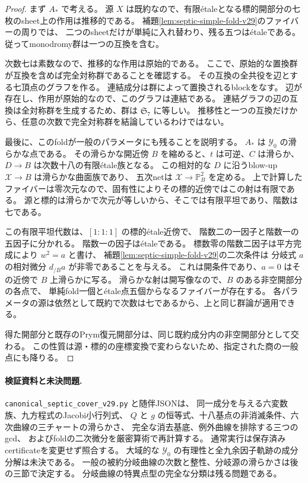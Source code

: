 \begin{proof}
まず $A_*$ で考える。
源 $X$ は既約なので、有限\'etaleとなる標的開部分の七枚のsheet上の作用は推移的である。
補題\ref{lem:septic-simple-fold-v29}のファイバーの周りでは、
二つのsheetだけが単純に入れ替わり、残る五つは\'etaleである。
従ってmonodromy群は一つの互換を含む。

次数七は素数なので、推移的な作用は原始的である。
ここで、原始的な置換群が互換を含めば完全対称群であることを確認する。
その互換の全共役を辺とする七頂点のグラフを作る。
連結成分は群によって置換されるblockをなす。
辺が存在し、作用が原始的なので、このグラフは連結である。
連結グラフの辺の互換は全対称群を生成するため、群は $\mathfrak S_7$ に等しい。
推移性と一つの互換だけから、任意の次数で完全対称群を結論しているわけではない。

最後に、このfoldが一般のパラメータにも残ることを説明する。
$A_*$ は $\mathcal Y_0$ の滑らかな点である。
その滑らかな開近傍 $B$ を縮めると、$t$ は可逆、$C$ は滑らか、
$D\to B$ は次数十八の有限\'etale族となる。
この相対的な $D$ に沿うblow-up $\mathcal X\to B$ は滑らかな曲面族であり、
五次netは $\mathcal X\to\mathbb P^2_B$ を定める。
上で計算したファイバーは零次元なので、固有性によりその標的近傍ではこの射は有限である。
源と標的は滑らかで次元が等しいから、そこでは有限平坦であり、階数は七である。

この有限平坦代数は、$[1:1:1]$ の標的\'etale近傍で、
階数二の一因子と階数一の五因子に分かれる。
階数一の因子は\'etaleである。
標数零の階数二因子は平方完成により $w^2=a$ と書け、
補題\ref{lem:septic-simple-fold-v29}の二次条件は
分岐式 $a$ の相対微分 $d_{/B}a$ が非零であることを与える。
これは開条件であり、$a=0$ はその近傍で $B$ 上滑らかに写る。
滑らかな射は開写像なので、$B$ のある非空開部分の各点で、
単純fold一個と\'etale点五個からなるファイバーが存在する。
各パラメータの源は依然として既約で次数は七であるから、上と同じ群論が適用できる。

得た開部分と既存のPrym復元開部分は、同じ既約成分内の非空開部分として交わる。
この性質は源・標的の座標変換で変わらないため、指定された商の一般点にも降りる。
\end{proof}

\paragraph{検証資料と未決問題.}
\nolinkurl{canonical_septic_cover_v29.py} と随伴JSONは、
同一成分を与える六変数族、九方程式のJacobi小行列式、
$Q$ と $g$ の恒等式、十八基点の非消滅条件、六次曲線の三チャートの滑らかさ、
完全な消去基底、例外曲線を排除する三つのgcd、
およびfoldの二次微分を厳密算術で再計算する。
通常実行は保存済みcertificateを変更せず照合する。
大域的な $\mathcal Y_0$ の有理性と全九余因子軌跡の成分分解は未決である。
一般の被約分岐曲線の次数と整性、分岐源の滑らかさは後の三節で決定する。
分岐曲線の特異点型の完全な分類は残る問題である。
